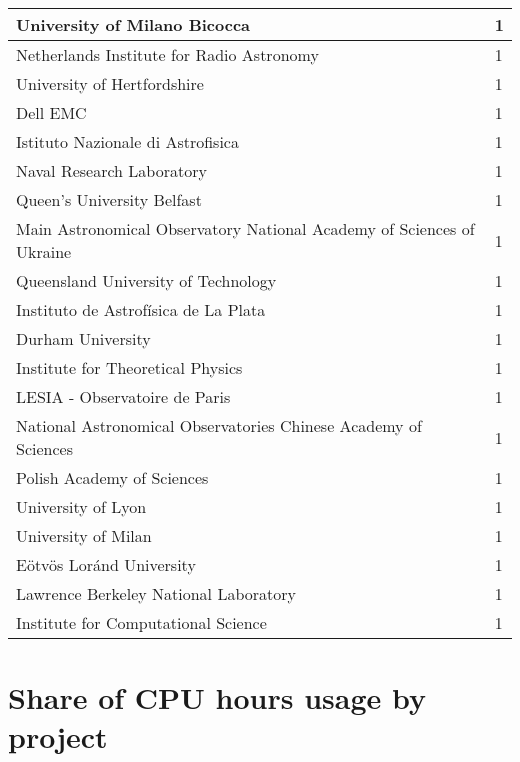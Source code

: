 \documentclass{article}%
\begin{document}
\begin{longtabu}{X[l] X[r]}
\hline%
University of Milano Bicocca&1\\%
\hline%
Netherlands Institute for Radio Astronomy&1\\%
\hline%
University of Hertfordshire&1\\%
\hline%
Dell EMC&1\\%
\hline%
Istituto Nazionale di Astrofisica&1\\%
\hline%
Naval Research Laboratory&1\\%
\hline%
Queen's University Belfast&1\\%
\hline%
Main Astronomical Observatory National Academy of Sciences of Ukraine&1\\%
\hline%
Queensland University of Technology&1\\%
\hline%
Instituto de Astrofísica de La Plata&1\\%
\hline%
Durham University&1\\%
\hline%
Institute for Theoretical Physics&1\\%
\hline%
LESIA {-} Observatoire de Paris&1\\%
\hline%
National Astronomical Observatories Chinese Academy of Sciences&1\\%
\hline%
Polish Academy of Sciences&1\\%
\hline%
University of Lyon&1\\%
\hline%
University of Milan&1\\%
\hline%
Eötvös Loránd University&1\\%
\hline%
Lawrence Berkeley National Laboratory&1\\%
\hline%
Institute for Computational Science&1\\%
\hline%
\end{longtabu}%
\section{Share of CPU hours usage by project}%
\end{document}
